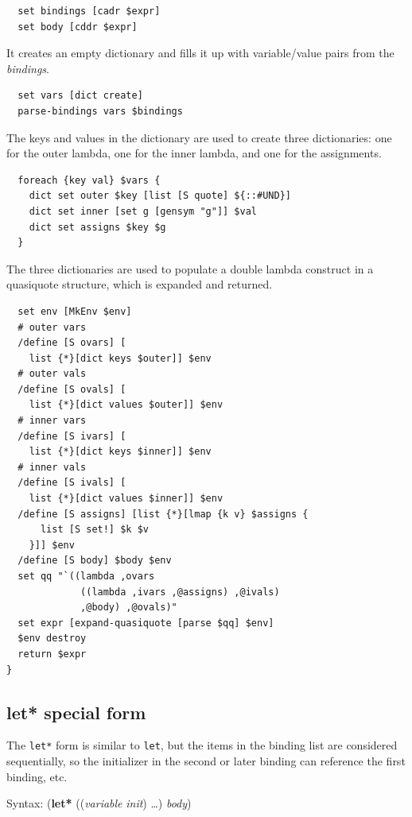 \documentclass[a5paper,draft]{memoir}
\begin{document}
\begin{lstlisting}
  set bindings [cadr $expr]
  set body [cddr $expr]
\end{lstlisting}

It creates an empty dictionary and fills it up with variable/value pairs from the \emph{bindings}.

\begin{lstlisting}
  set vars [dict create]
  parse-bindings vars $bindings
\end{lstlisting}

The keys and values in the dictionary are used to create three dictionaries: one for the outer lambda, one for the inner lambda, and one for the assignments.

\begin{lstlisting}
  foreach {key val} $vars {
    dict set outer $key [list [S quote] ${::#UND}]
    dict set inner [set g [gensym "g"]] $val
    dict set assigns $key $g
  }
\end{lstlisting}

The three dictionaries are used to populate a double lambda construct in a quasiquote structure, which is expanded and returned.

\begin{lstlisting}
  set env [MkEnv $env]
  # outer vars
  /define [S ovars] [
    list {*}[dict keys $outer]] $env
  # outer vals
  /define [S ovals] [
    list {*}[dict values $outer]] $env
  # inner vars
  /define [S ivars] [
    list {*}[dict keys $inner]] $env
  # inner vals
  /define [S ivals] [
    list {*}[dict values $inner]] $env
  /define [S assigns] [list {*}[lmap {k v} $assigns {
      list [S set!] $k $v
    }]] $env
  /define [S body] $body $env
  set qq "`((lambda ,ovars
             ((lambda ,ivars ,@assigns) ,@ivals)
             ,@body) ,@ovals)"
  set expr [expand-quasiquote [parse $qq] $env]
  $env destroy
  return $expr
}
\end{lstlisting}

\subsection{let* special form}
\label{let-special-form1}

The \texttt{let*} form is similar to \texttt{let}, but the items in the binding list are considered sequentially, so the initializer in the second or later binding can reference the first binding, etc.

Syntax: (\textbf{let*} ((\emph{variable} \emph{init}) \ldots ) \emph{body})
\end{document}

